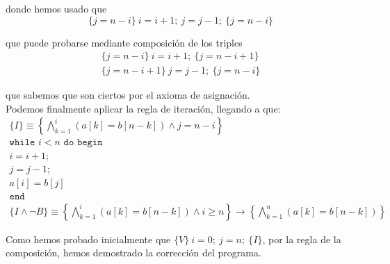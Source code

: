 \begin{ejercicio}
    donde hemos usado que
    \begin{equation*}
        \{j = n-i\}\ i=i+1;\ j=j-1;\ \{j = n-i\}
    \end{equation*}

    que puede probarse mediante composición de los triples
    \begin{gather*}
        \{j=n-i\}\ i=i+1;\ \{j=n-i+1\} \\
        \{j=n-i+1\}\ j=j-1;\ \{j=n-i\}
    \end{gather*}

    que sabemos que son ciertos por el axioma de asignación. \\

    Podemos finalmente aplicar la regla de iteración, llegando a que:
    \begin{gather*}
        \{I\} \equiv \left\{\bigwedge_{k=1}^{i}(a[k] = b[n-k]) \land j = n-i\right\} \\
        \texttt{while\ } i < n \texttt{\ do\ begin} \\
        i = i + 1; \\
        j = j - 1; \\
        a[i] = b[j] \\
        \texttt{end} \\
        \{I \land \lnot B\} \equiv \left\{\bigwedge_{k=1}^{i}(a[k] = b[n-k]) \land i\geq n\right\} \rightarrow \left\{\bigwedge_{k=1}^{n}(a[k] = b[n-k]) \right\}
    \end{gather*}
    
    Como hemos probado inicialmente que $\{V\}\ i=0;\ j=n;\ \{I\}$, por la regla de la composición, hemos demostrado la corrección del programa.
\end{ejercicio}

